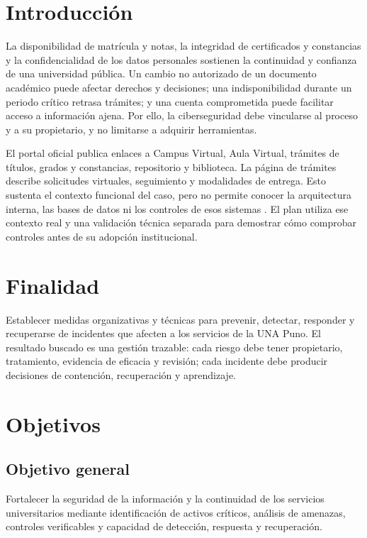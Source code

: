 \documentclass[10pt,a4paper]{article}
\begin{document}
\section{Introducción}
La disponibilidad de matrícula y notas, la integridad de certificados y constancias y la confidencialidad de los datos personales sostienen la continuidad y confianza de una universidad pública. Un cambio no autorizado de un documento académico puede afectar derechos y decisiones; una indisponibilidad durante un periodo crítico retrasa trámites; y una cuenta comprometida puede facilitar acceso a información ajena. Por ello, la ciberseguridad debe vincularse al proceso y a su propietario, y no limitarse a adquirir herramientas.

El portal oficial publica enlaces a Campus Virtual, Aula Virtual, trámites de títulos, grados y constancias, repositorio y biblioteca. La página de trámites describe solicitudes virtuales, seguimiento y modalidades de entrega. Esto sustenta el contexto funcional del caso, pero no permite conocer la arquitectura interna, las bases de datos ni los controles de esos sistemas \cite{R01}. El plan utiliza ese contexto real y una validación técnica separada para demostrar cómo comprobar controles antes de su adopción institucional.

\section{Finalidad}
Establecer medidas organizativas y técnicas para prevenir, detectar, responder y recuperarse de incidentes que afecten a los servicios de la UNA Puno. El resultado buscado es una gestión trazable: cada riesgo debe tener propietario, tratamiento, evidencia de eficacia y revisión; cada incidente debe producir decisiones de contención, recuperación y aprendizaje.

\section{Objetivos}
\subsection{Objetivo general}
Fortalecer la seguridad de la información y la continuidad de los servicios universitarios mediante identificación de activos críticos, análisis de amenazas, controles verificables y capacidad de detección, respuesta y recuperación.
\end{document}
